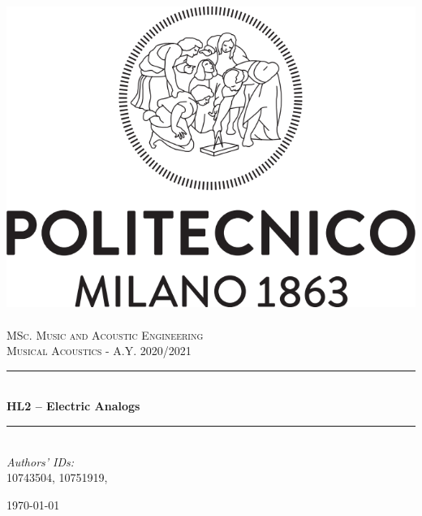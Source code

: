 \documentclass[a4paper]{article}
\title{}
\author{}
\begin{document}
\begin{titlepage}	
	\newcommand{\HRule}{\rule{\linewidth}{0.5mm}} %
	
	\center %
	
	
	\includegraphics[width=.4\textwidth]{Logo_Politecnico_Milano.png}\\[0.4cm]
	\textsc{\LARGE}\\[0.3cm] %
	
	\textsc{\large MSc. Music and Acoustic Engineering}\\[1cm] %
	
	\textsc{\Large Musical Acoustics - A.Y. 2020/2021}\\[0.5cm] %
	
	
	\HRule\\[0.4cm]
	
	{\huge\bfseries HL2 – Electric Analogs}\\[0.4cm] %
	
	\HRule\\[1.5cm]
	
	
	
	{\large\textit{Authors' IDs:}}\\
	10743504, 10751919, %
	
	
	\vfill\vfill\vfill %
	
	{\large\today} %
	
	
	\vfill\vfill
	
	
	\vfill %
	
	
\end{titlepage}
\end{document}
